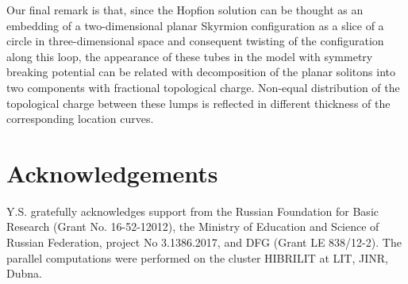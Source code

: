 \documentclass[12pt,a4paper]{article}
\begin{document}
Our final remark is that, since the Hopfion solution can be thought as an embedding of a two-dimensional
planar Skyrmion configuration as a slice of a circle in
three-dimensional space and consequent twisting of the configuration  along this loop,
the appearance of these tubes in the  model with symmetry breaking potential can be related with
decomposition of the planar solitons into two components with fractional topological charge.
Non-equal distribution of the topological charge between these lumps is reflected in different
thickness of the corresponding location curves.

\section*{Acknowledgements}
Y.S. gratefully
acknowledges support from the Russian Foundation for Basic Research
(Grant No. 16-52-12012), the Ministry of Education and Science
of Russian Federation, project No 3.1386.2017, and DFG (Grant LE 838/12-2).
The parallel computations were performed on the cluster HIBRILIT at LIT, JINR, Dubna.
\end{document}
